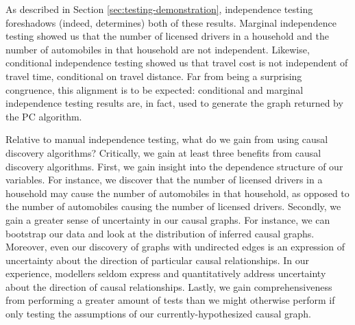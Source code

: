 As described in Section \ref{sec:testing-demonstration}, independence testing foreshadows (indeed, determines) both of these results.
Marginal independence testing showed us that the number of licensed drivers in a household and the number of automobiles in that household are not independent.
Likewise, conditional independence testing showed us that travel cost is not independent of travel time, conditional on travel distance.
Far from being a surprising congruence, this alignment is to be expected: conditional and marginal independence testing results are, in fact, used to generate the graph returned by the PC algorithm.

Relative to manual independence testing, what do we gain from using causal discovery algorithms?
Critically, we gain at least three benefits from causal discovery algorithms.
First, we gain insight into the dependence structure of our variables.
For instance, we discover that the number of licensed drivers in a household may cause the number of automobiles in that household, as opposed to the number of automobiles causing the number of licensed drivers.
Secondly, we gain a greater sense of uncertainty in our causal graphs.
For instance, we can bootstrap our data and look at the distribution of inferred causal graphs.
Moreover, even our discovery of graphs with undirected edges is an expression of uncertainty about the direction of particular causal relationships.
In our experience, modellers seldom express and quantitatively address uncertainty about the direction of causal relationships.
Lastly, we gain comprehensiveness from performing a greater amount of tests than we might otherwise perform if only testing the assumptions of our currently-hypothesized causal graph.
